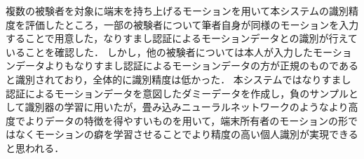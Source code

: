 複数の被験者を対象に端末を持ち上げるモーションを用いて本システムの識別精度を評価したところ，一部の被験者について筆者自身が同様のモーションを入力することで用意した，なりすまし認証によるモーションデータとの識別が行えていることを確認した．
しかし，他の被験者については本人が入力したモーションデータよりもなりすまし認証によるモーションデータの方が正規のものであると識別されており，全体的に識別精度は低かった．
本システムではなりすまし認証によるモーションデータを意図したダミーデータを作成し，負のサンプルとして識別器の学習に用いたが，畳み込みニューラルネットワークのようなより高度でよりデータの特徴を得やすいものを用いて，端末所有者のモーションの形ではなくモーションの癖を学習させることでより精度の高い個人識別が実現できると思われる．

